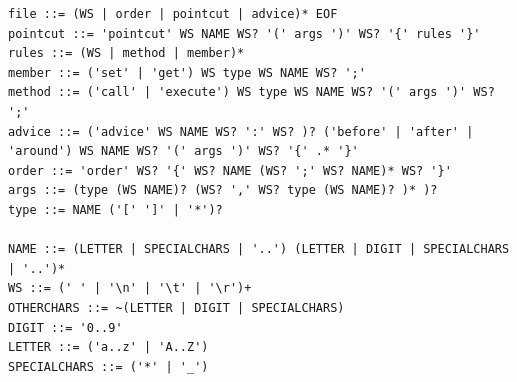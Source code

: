 \documentclass[a4paper]{report}
\begin{document}
\begin{lstlisting}[caption=EBNF notation of the aspect langauge, label=lst:SmallC_EBNF]
file ::= (WS | order | pointcut | advice)* EOF
pointcut ::= 'pointcut' WS NAME WS? '(' args ')' WS? '{' rules '}'
rules ::= (WS | method | member)*
member ::= ('set' | 'get') WS type WS NAME WS? ';'
method ::= ('call' | 'execute') WS type WS NAME WS? '(' args ')' WS? ';'
advice ::= ('advice' WS NAME WS? ':' WS? )? ('before' | 'after' | 'around') WS NAME WS? '(' args ')' WS? '{' .* '}' 
order ::= 'order' WS? '{' WS? NAME (WS? ';' WS? NAME)* WS? '}' 
args ::= (type (WS NAME)? (WS? ',' WS? type (WS NAME)? )* )?
type ::= NAME ('[' ']' | '*')?

NAME ::= (LETTER | SPECIALCHARS | '..') (LETTER | DIGIT | SPECIALCHARS | '..')* 
WS ::= (' ' | '\n' | '\t' | '\r')+
OTHERCHARS ::= ~(LETTER | DIGIT | SPECIALCHARS)
DIGIT ::= '0..9'
LETTER ::= ('a..z' | 'A..Z')
SPECIALCHARS ::= ('*' | '_')
\end{lstlisting}
\end{document}
